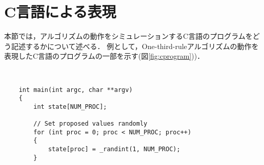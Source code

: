 \documentclass[technicalreport]{ieicej}
\theoremstyle{plain}
\begin{document}


\section{C言語による表現}\label{sec:clang}

本節では，アルゴリズムの動作をシミュレーションするC言語のプログラムをどう記述するかについて述べる．
例として，One-third-ruleアルゴリズムの動作を表現したC言語のプログラムの一部を示す(図\ref{fig:cprogram}))．


\begin{figure*}
	\centering　{\scriptsize
\begin{lstlisting}
    int main(int argc, char **argv)
    {
        int state[NUM_PROC];
                
        // Set proposed values randomly
        for (int proc = 0; proc < NUM_PROC; proc++)
        {
            state[proc] = _randint(1, NUM_PROC);
        }
        

\end{lstlisting}}
\end{figure*}
\end{document}
